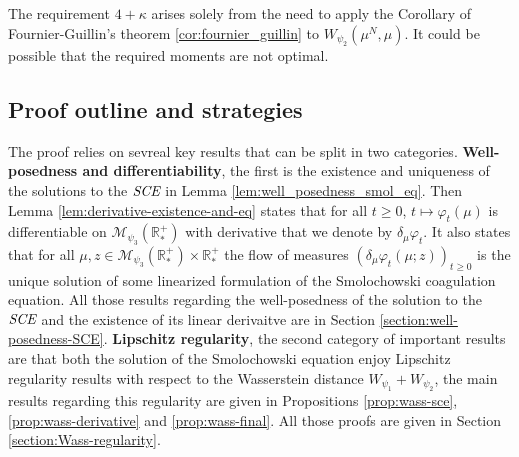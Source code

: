\documentclass[11pt,a4paper]{article}
\newcommand{\RRP}{\mathbb{R}^+_*}
\newcommand{\MC}{\mathcal{M}}
\newcommand{\SCE}{\emph{SCE}}
\newcommand{\Proc}[1]{\left(#1\right)_{t\geq 0}}
\begin{document}
The requirement $4 + \kappa$ arises solely from the need to apply the Corollary of Fournier-Guillin's theorem \ref{cor:fournier_guillin} to $W_{\psi_2}\left(\mu^N,\mu\right)$. It could be possible that the required moments are not optimal.

\subsection{Proof outline and strategies}
The proof relies on sevreal key results that can be split in two categories. \textbf{Well-posedness and differentiability}, the first is the existence and uniqueness of the solutions to the $\SCE$ in Lemma \ref{lem:well_posedness_smol_eq}. Then Lemma \ref{lem:derivative-existence-and-eq} states that for all $t \geq 0$,  $t \mapsto \varphi_t(\mu)$ is differentiable on $\MC_{\psi_3}(\RRP)$ with derivative that we denote by $\delta_\mu \varphi_t$. It also states that for all $\mu,z \in \MC_{\psi_3}(\RRP) \times \RRP$ the flow of measures $\Proc{\delta_\mu \varphi_t(\mu;z)}$ is the unique solution of some linearized formulation of the Smolochowski coagulation equation. All those results regarding the well-posedness of the solution to the $\SCE$ and the existence of its linear derivaitve are in Section \ref{section:well-posedness-SCE}. 
\textbf{Lipschitz regularity}, the second category of important results are that both the solution of the Smolochowski equation enjoy Lipschitz regularity results with respect to the Wasserstein distance $W_{\psi_1} + W_{\psi_2}$, the main results regarding this regularity are given in Propositions \ref{prop:wass-sce},\ref{prop:wass-derivative} and \ref{prop:wass-final}. All those proofs are given in Section \ref{section:Wass-regularity}.
\end{document}
